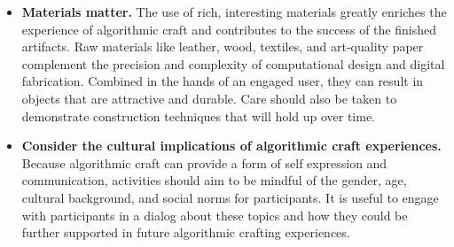 \documentclass{sigchi}
\begin{document}
\begin{itemize}

\item \textbf{Materials matter.} The use of rich, interesting materials greatly enriches the experience of algorithmic craft and contributes to the success of the finished artifacts. Raw materials like leather, wood, textiles, and art-quality paper complement the precision and complexity of computational design and digital fabrication. Combined in the hands of an engaged user, they can result in objects that are attractive and durable. Care should also be taken to demonstrate construction techniques that will hold up over time.

\item \textbf{Consider the cultural implications of algorithmic craft experiences.} Because algorithmic craft can provide a form of self expression and communication, activities should aim to be mindful of the gender, age, cultural background, and social norms for participants. It is useful to engage with participants in a dialog about these topics and how they could be further supported in future algorithmic crafting experiences.
\end{itemize}


\balance




\end{document}
